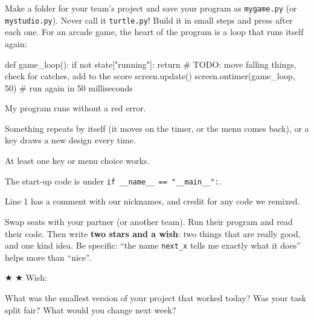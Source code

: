 \begin{exercise}
Make a folder for your team's project and save your program as \texttt{mygame.py} (or
\texttt{mystudio.py}). Never call it \texttt{turtle.py}! Build it in small steps and press 
after each one. For an arcade game, the heart of the program is a loop that runs itself again:
\begin{pycode}
def game_loop():
    if not state["running"]:
        return
    # TODO: move falling things, check for catches, add to the score
    screen.update()
    screen.ontimer(game_loop, 50)   # run again in 50 milliseconds
\end{pycode}
\begin{checklist}
  \item My program runs without a red error.
  \item Something repeats by itself (it moves on the timer, or the menu comes back), or a key draws a new design every time.
  \item At least one key or menu choice works.
  \item The start-up code is under \texttt{if \_\_name\_\_ == "\_\_main\_\_":}.
  \item Line 1 has a comment with our nicknames, and credit for any code we remixed.
\end{checklist}
\end{exercise}

\begin{exercise}
Swap seats with your partner (or another team). Run their program and read their code. Then write
\textbf{two stars and a wish}: two things that are really good, and one kind idea. Be specific:
\enquote{the name \texttt{next\_x} tells me exactly what it does} helps more than \enquote{nice}.

★ 
★ 
Wish: 
\end{exercise}

\begin{vocab}
\end{vocab}

\begin{reflection}
What was the smallest version of your project that worked today?
Was your task split fair? What would you change next week?
\end{reflection}
